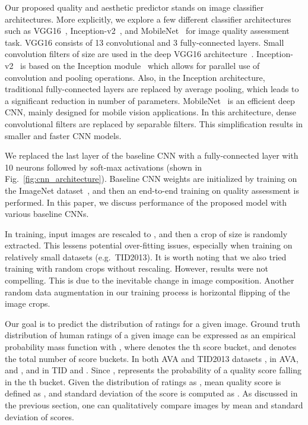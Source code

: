 \documentclass[10pt,twocolumn,twoside]{IEEEtran}
\begin{document}
Our proposed quality and aesthetic predictor stands on image classifier architectures. More explicitly, we explore a few different classifier architectures such as VGG16~\cite{simonyan2014very}, Inception-v2~\cite{szegedy2016rethinking}, and MobileNet~\cite{howard2017mobilenets} for image quality assessment task. VGG16 consists of 13 convolutional and 3 fully-connected layers. Small convolution filters of size  are used in the deep VGG16 architecture~\cite{simonyan2014very}. Inception-v2~\cite{szegedy2016rethinking} is based on the Inception module~\cite{ioffe2015batch} which allows for parallel use of convolution and pooling operations. Also, in the Inception architecture, traditional fully-connected layers are replaced by average pooling, which leads to a significant reduction in number of parameters. MobileNet~\cite{howard2017mobilenets} is an efficient deep CNN, mainly designed for mobile vision applications. In this architecture, dense convolutional filters are replaced by separable filters. This simplification results in smaller and faster CNN models. 

We replaced the last layer of the baseline CNN with a fully-connected layer with 10 neurons followed by soft-max activations (shown in Fig.~\ref{fig:cnn_architecture}). Baseline CNN weights are initialized by training on the ImageNet dataset~\cite{krizhevsky2012imagenet}, and then an end-to-end training on quality assessment is performed. In this paper, we discuss performance of the proposed model with various baseline CNNs.

In training, input images are rescaled to , and then a crop of size  is randomly extracted. This lessens potential over-fitting issues, especially when training on relatively small datasets (e.g.\ TID2013). It is worth noting that we also tried training with random crops without rescaling. However, results were not compelling. This is due to the inevitable change in image composition. Another random data augmentation in our training process is horizontal flipping of the image crops.

Our goal is to predict the distribution of ratings for a given image. Ground truth distribution of human ratings of a given image can be expressed as an empirical probability mass function  with , where  denotes the th score bucket, and  denotes the total number of score buckets. In both AVA and TID2013 datasets ,  in AVA,  and , and in TID  and . Since ,  represents the probability of a quality score falling in the th bucket. Given the distribution of ratings as , mean quality score is defined as , and standard deviation of the score is computed as . As discussed in the previous section, one can qualitatively compare images by mean and standard deviation of scores.
\end{document}
